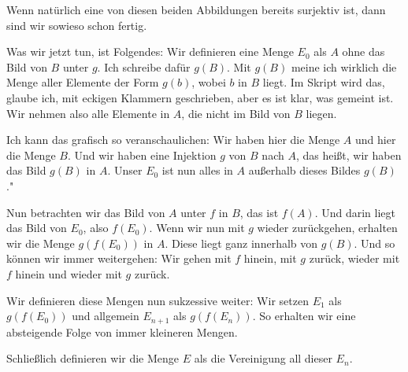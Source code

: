 \begin{math-stroke}
\end{math-stroke}

\begin{spoken-clean}[00:24:22 - 00:26:00]
Wenn natürlich eine von diesen beiden Abbildungen bereits surjektiv ist, dann sind wir sowieso schon fertig. 

Was wir jetzt tun, ist Folgendes: Wir definieren eine Menge $E_0$ als $A$ ohne das Bild von $B$ unter $g$. Ich schreibe dafür $g(B)$. Mit $g(B)$ meine ich wirklich die Menge aller Elemente der Form $g(b)$, wobei $b$ in $B$ liegt. Im Skript wird das, glaube ich, mit eckigen Klammern geschrieben, aber es ist klar, was gemeint ist. Wir nehmen also alle Elemente in $A$, die nicht im Bild von $B$ liegen.

Ich kann das grafisch so veranschaulichen: Wir haben hier die Menge $A$ und hier die Menge $B$. Und wir haben eine Injektion $g$ von $B$ nach $A$, das heißt, wir haben das Bild $g(B)$ in $A$. Unser $E_0$ ist nun alles in $A$ außerhalb dieses Bildes $g(B)$."
\end{spoken-clean}

\begin{spoken-clean}[00:26:00 - 00:27:30]
Nun betrachten wir das Bild von $A$ unter $f$ in $B$, das ist $f(A)$. Und darin liegt das Bild von $E_0$, also $f(E_0)$. Wenn wir nun mit $g$ wieder zurückgehen, erhalten wir die Menge $g(f(E_0))$ in $A$. Diese liegt ganz innerhalb von $g(B)$. Und so können wir immer weitergehen: Wir gehen mit $f$ hinein, mit $g$ zurück, wieder mit $f$ hinein und wieder mit $g$ zurück.

Wir definieren diese Mengen nun sukzessive weiter: Wir setzen $E_1$ als $g(f(E_0))$ und allgemein $E_{n+1}$ als $g(f(E_n))$. So erhalten wir eine absteigende Folge von immer kleineren Mengen.

Schließlich definieren wir die Menge $E$ als die Vereinigung all dieser $E_n$.
\end{spoken-clean}

